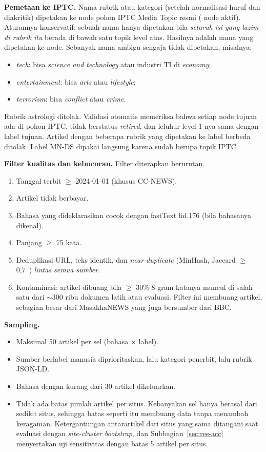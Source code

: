 \documentclass[journal]{IEEEtran}
\newcommand{\eng}[1]{\textit{#1}}   %
\begin{document}
\textbf{Pemetaan ke IPTC.} Nama rubrik atau kategori (setelah normalisasi huruf dan diakritik) dipetakan ke node pohon IPTC Media Topic resmi ( node aktif). Aturannya konservatif: sebuah nama hanya dipetakan bila \emph{seluruh isi yang lazim di rubrik itu} berada di bawah satu topik level atas. Hasilnya adalah  nama yang dipetakan ke  node. Sebanyak  nama ambigu sengaja tidak dipetakan, misalnya:
\begin{itemize}
  \item \eng{tech}: bisa \eng{science and technology} atau industri TI di \eng{economy};
  \item \eng{entertainment}: bisa \eng{arts} atau \eng{lifestyle};
  \item \eng{terrorism}: bisa \eng{conflict} atau \eng{crime}.
\end{itemize}
Rubrik astrologi ditolak. Validasi otomatis memeriksa bahwa setiap node tujuan ada di pohon IPTC, tidak berstatus \eng{retired}, dan leluhur level-1-nya sama dengan label tujuan. Artikel dengan beberapa rubrik yang dipetakan ke label berbeda ditolak. Label MN-DS dipakai langsung karena sudah berupa topik IPTC.

\textbf{Filter kualitas dan kebocoran.} Filter diterapkan berurutan.
\begin{enumerate}
  \item Tanggal terbit $\ge$ 2024-01-01 (khusus CC-NEWS).
  \item Artikel tidak berbayar.
  \item Bahasa yang dideklarasikan cocok dengan fastText lid.176 (bila bahasanya dikenal).
  \item Panjang $\ge$ 75 kata.
  \item Deduplikasi URL, teks identik, dan \eng{near-duplicate} (MinHash, Jaccard $\ge$ 0,7~\cite{broder1997resemblance,lee2022dedup}) \emph{lintas semua sumber}.
  \item Kontaminasi: artikel dibuang bila $\ge$ 30\% 8-gram katanya muncul di salah satu dari $\sim$300 ribu dokumen latih atau evaluasi. Filter ini membuang  artikel, sebagian besar dari MasakhaNEWS yang juga bersumber dari BBC.
\end{enumerate}

\textbf{Sampling.}
\begin{itemize}
  \item Maksimal 50 artikel per sel (bahasa $\times$ label).
  \item Sumber berlabel manusia diprioritaskan, lalu kategori penerbit, lalu rubrik JSON-LD.
  \item Bahasa dengan kurang dari 30 artikel dikeluarkan.
  \item Tidak ada batas jumlah artikel per situs. Kebanyakan sel hanya berasal dari sedikit situs, sehingga batas seperti itu membuang data tanpa menambah keragaman. Ketergantungan antarartikel dari situs yang sama ditangani saat evaluasi dengan \eng{site-cluster bootstrap}, dan Subbagian~\ref{sec:res-acc} menyertakan uji sensitivitas dengan batas 5 artikel per situs.
\end{itemize}
\end{document}
